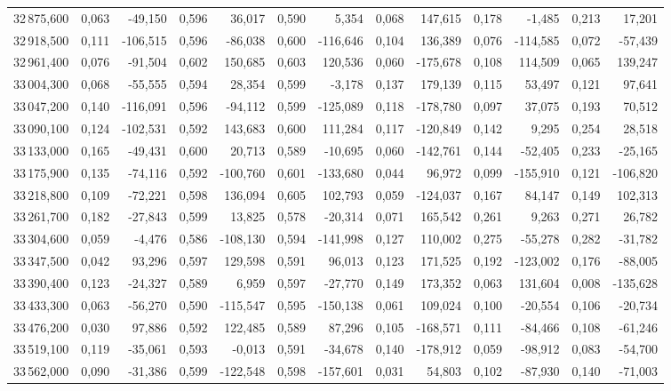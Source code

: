 \begin{longtable}{rrrrrrrrrrrrr}
32\,875,600 & 0,063 & -49,150 & 0,596 & 36,017 & 0,590 & 5,354 & 0,068 & 147,615 & 0,178 & -1,485 & 0,213 & 17,201\\
32\,918,500 & 0,111 & -106,515 & 0,596 & -86,038 & 0,600 & -116,646 & 0,104 & 136,389 & 0,076 & -114,585 & 0,072 & -57,439\\
32\,961,400 & 0,076 & -91,504 & 0,602 & 150,685 & 0,603 & 120,536 & 0,060 & -175,678 & 0,108 & 114,509 & 0,065 & 139,247\\
33\,004,300 & 0,068 & -55,555 & 0,594 & 28,354 & 0,599 & -3,178 & 0,137 & 179,139 & 0,115 & 53,497 & 0,121 & 97,641\\
33\,047,200 & 0,140 & -116,091 & 0,596 & -94,112 & 0,599 & -125,089 & 0,118 & -178,780 & 0,097 & 37,075 & 0,193 & 70,512\\
33\,090,100 & 0,124 & -102,531 & 0,592 & 143,683 & 0,600 & 111,284 & 0,117 & -120,849 & 0,142 & 9,295 & 0,254 & 28,518\\
33\,133,000 & 0,165 & -49,431 & 0,600 & 20,713 & 0,589 & -10,695 & 0,060 & -142,761 & 0,144 & -52,405 & 0,233 & -25,165\\
33\,175,900 & 0,135 & -74,116 & 0,592 & -100,760 & 0,601 & -133,680 & 0,044 & 96,972 & 0,099 & -155,910 & 0,121 & -106,820\\
33\,218,800 & 0,109 & -72,221 & 0,598 & 136,094 & 0,605 & 102,793 & 0,059 & -124,037 & 0,167 & 84,147 & 0,149 & 102,313\\
33\,261,700 & 0,182 & -27,843 & 0,599 & 13,825 & 0,578 & -20,314 & 0,071 & 165,542 & 0,261 & 9,263 & 0,271 & 26,782\\
33\,304,600 & 0,059 & -4,476 & 0,586 & -108,130 & 0,594 & -141,998 & 0,127 & 110,002 & 0,275 & -55,278 & 0,282 & -31,782\\
33\,347,500 & 0,042 & 93,296 & 0,597 & 129,598 & 0,591 & 96,013 & 0,123 & 171,525 & 0,192 & -123,002 & 0,176 & -88,005\\
33\,390,400 & 0,123 & -24,327 & 0,589 & 6,959 & 0,597 & -27,770 & 0,149 & 173,352 & 0,063 & 131,604 & 0,008 & -135,628\\
33\,433,300 & 0,063 & -56,270 & 0,590 & -115,547 & 0,595 & -150,138 & 0,061 & 109,024 & 0,100 & -20,554 & 0,106 & -20,734\\
33\,476,200 & 0,030 & 97,886 & 0,592 & 122,485 & 0,589 & 87,296 & 0,105 & -168,571 & 0,111 & -84,466 & 0,108 & -61,246\\
33\,519,100 & 0,119 & -35,061 & 0,593 & -0,013 & 0,591 & -34,678 & 0,140 & -178,912 & 0,059 & -98,912 & 0,083 & -54,700\\
33\,562,000 & 0,090 & -31,386 & 0,599 & -122,548 & 0,598 & -157,601 & 0,031 & 54,803 & 0,102 & -87,930 & 0,140 & -71,003\\

\end{longtable}
